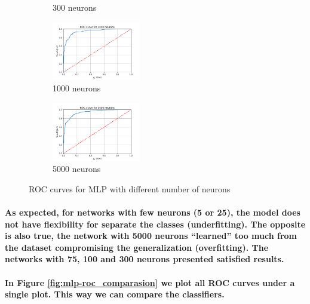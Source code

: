 \documentclass[a4paper]{article}    %
\begin{document}
\begin{figure}[H]
\begin{subfigure}{0.32\textwidth}
        \caption{300 neurons}
        \label{fig:mlp-300_roc}
    \end{subfigure}
    \hfill
    \begin{subfigure}{0.32\textwidth}
        \centering
        \includegraphics[width=3.85cm]{ROC_1000}
        \caption{1000 neurons}
        \label{fig:mlp-1000_roc}
    \end{subfigure}
    \hfill
    \begin{subfigure}{0.32\textwidth}
        \centering
        \includegraphics[width=3.85cm]{ROC_5000}
        \caption{5000 neurons}
        \label{fig:mlp-5000_roc}
    \end{subfigure}
    \hfill
    \caption{ROC curves for MLP with different number of neurons}
    \label{fig:mlp-ROC_N_neurons}
\end{figure}

\paragraph{As expected, for networks with few neurons (5 or 25), the model does not have flexibility for separate the classes (underfitting). The opposite is also true, the network with 5000 neurons ``learned'' too much from the dataset compromising the generalization (overfitting). The networks with 75, 100 and 300 neurons presented satisfied results.}

\paragraph{In Figure \ref{fig:mlp-roc_comparasion} we plot all ROC curves under a single plot. This way we can compare the classifiers.}
\end{document}
